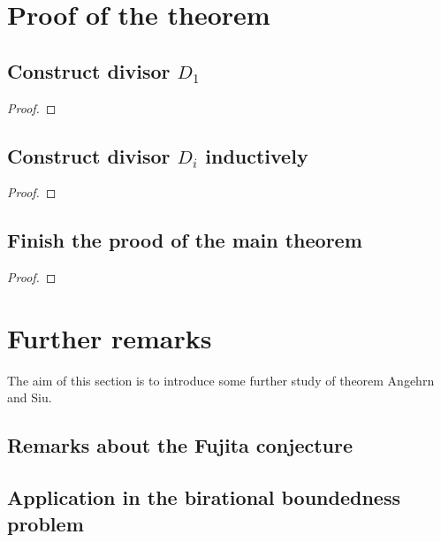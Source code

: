 \documentclass[11pt]{article}
\theoremstyle{definition}
\begin{document}
	\section{Proof of the theorem}
		\subsection{Construct divisor $D_1$}
		\begin{proof}
			
		\end{proof}
		\subsection{Construct divisor $D_i$ inductively}
		\begin{proof}
			
		\end{proof}
		\subsection{Finish the prood of the main theorem}
		\begin{proof}
			
		\end{proof}
		
	\section{Further remarks}
	The aim of this section is to introduce some further study of theorem Angehrn and Siu. 
	
	\subsection{Remarks about the Fujita conjecture}
	\subsection{Application in the birational boundedness problem}
\end{document}
